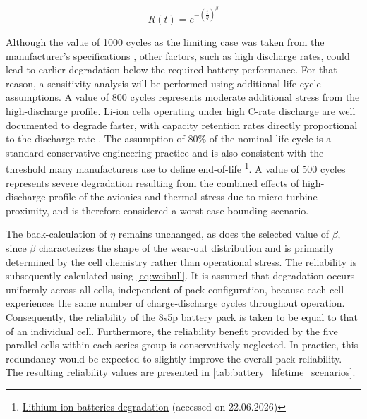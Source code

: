 \begin{equation}
    R(t) = e^{-(\frac{t}{\eta})^{\beta}}
    \label{eq:weibull}
\end{equation}


Although the value of 1000 cycles as the limiting case was taken from the manufacturer's specifications , other factors, such as high discharge rates, could lead to earlier degradation below the required battery performance. For that reason, a sensitivity analysis will be performed using additional life cycle assumptions. A value of 800 cycles represents moderate additional stress from the high-discharge profile. Li-ion cells operating under high C-rate discharge are well documented to degrade faster, with capacity retention rates directly proportional to the discharge rate \cite{Liu2024}. The assumption of 80\% of the nominal life cycle is a standard conservative engineering practice and is also consistent with the threshold many manufacturers use to define end-of-life \footnote{\href{https://www.idtechex.com/en/research-article/the-crucial-role-of-managing-end-of-life-li-ion-battery-sustainability/30302}{Lithium-ion batteries degradation} (accessed on 22.06.2026)}. A value of 500 cycles represents severe degradation resulting from the combined effects of high-discharge profile of the avionics and thermal stress due to micro-turbine proximity, and is therefore considered a worst-case bounding scenario.

The back-calculation of $\eta$ remains unchanged, as does the selected value of $\beta$, since $\beta$ characterizes the shape of the wear-out distribution and is primarily determined by the cell chemistry rather than operational stress. The reliability is subsequently calculated using \autoref{eq:weibull}. It is assumed that degradation occurs uniformly across all cells, independent of pack configuration, because each cell experiences the same number of charge-discharge cycles throughout operation. Consequently, the reliability of the 8s5p battery pack is taken to be equal to that of an individual cell. Furthermore, the reliability benefit provided by the five parallel cells within each series group is conservatively neglected. In practice, this redundancy would be expected to slightly improve the overall pack reliability. The resulting reliability values are presented in \autoref{tab:battery_lifetime_scenarios}.


